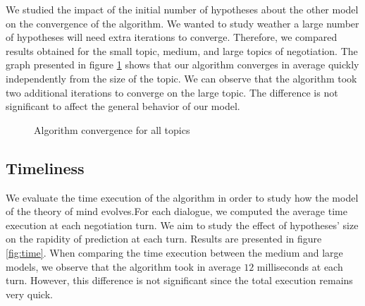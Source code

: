 \documentclass[sigconf]{aamas}  %
\begin{document}
	We studied the impact of the initial number of hypotheses about the other model on the convergence of the algorithm. We wanted to study weather a large number of hypotheses will need extra iterations to converge. Therefore, we compared results obtained for the small topic, medium, and large topics of negotiation. The graph presented in figure \ref{fig:converge} shows that our algorithm converges in average quickly independently from the size of the topic. We can observe that the algorithm took two additional iterations to converge on the large topic. The difference is not significant to affect the general behavior of our model.
	
		\begin{figure}[]
			\caption{Algorithm convergence for all topics} 
			\label{fig:converge}
		\end{figure}
	
	
	\subsection{Timeliness}
	We evaluate the time execution of the algorithm in order to study how the model of the theory of mind evolves.For each dialogue, we computed the average time execution at each negotiation turn. We aim to study the effect of hypotheses' size on the rapidity of prediction at each turn. Results are presented in figure \ref{fig:time}. When comparing the time execution between the medium and large models, we observe that the algorithm took in average $12$ milliseconds at each turn. However, this difference is not significant since the total execution remains very quick.
	
\end{document}
